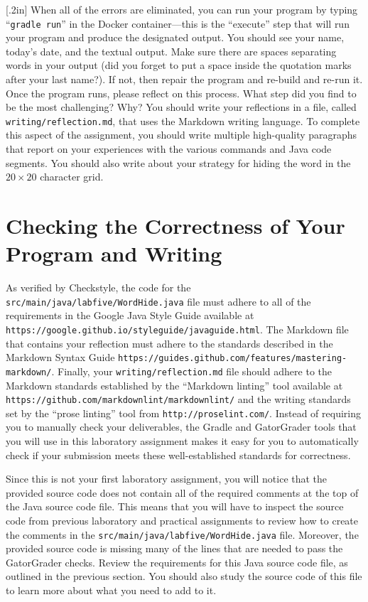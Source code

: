 \documentclass[11pt]{article}
\newcommand{\mainprogramsource}{\lstinline{src/main/java/labfive/WordHide.java}}
\newcommand{\reflection}{\lstinline{writing/reflection.md}}
\newcommand{\gradlerun}{\command{gradle run}}
\newcommand{\command}[1]{``\lstinline{#1}''}
\newcommand{\url}[1]{\lstinline{#1}}
\newcommand{\step}[1]{``{#1}''}
\newcommand{\think}[1]{\null\hfill\LARGE{\faCogs{}}\newline\scriptsize{\em{#1}}}
\begin{document}
\marginnote{\think{Reflect on challenges}}[.2in] When all of the errors are
eliminated, you can run your program by typing \gradlerun{} in the Docker
container---this is the ``execute'' step that will run your program and produce
the designated output. You should see your name, today's date, and the textual
output. Make sure there are spaces separating words in your output (did you
forget to put a space inside the quotation marks after your last name?). If not,
then repair the program and re-build and re-run it. Once the program runs,
please reflect on this process. What step did you find to be the most
challenging? Why? You should write your reflections in a file, called
\reflection{}, that uses the Markdown writing language. To complete this aspect
of the assignment, you should write multiple high-quality paragraphs that report
on your experiences with the various commands and Java code segments. You should
also write about your strategy for hiding the word in the $20 \times 20$
character grid.

\section*{Checking the Correctness of Your Program and Writing}

As verified by Checkstyle, the code for the \mainprogramsource{} file must
adhere to all of the requirements in the Google Java Style Guide available at
\url{https://google.github.io/styleguide/javaguide.html}. The Markdown file that
contains your reflection must adhere to the standards described in the Markdown
Syntax Guide \url{https://guides.github.com/features/mastering-markdown/}.
Finally, your \reflection{} file should adhere to the Markdown standards
established by the \step{Markdown linting} tool available at
\url{https://github.com/markdownlint/markdownlint/} and the writing standards
set by the \step{prose linting} tool from \url{http://proselint.com/}. Instead
of requiring you to manually check your deliverables, the Gradle and GatorGrader
tools that you will use in this laboratory assignment makes it easy for you to
automatically check if your submission meets these well-established standards
for correctness.

Since this is not your first laboratory assignment, you will notice that the
provided source code does not contain all of the required comments at the top of
the Java source code file. This means that you will have to inspect the source
code from previous laboratory and practical assignments to review how to create
the comments in the \mainprogramsource{} file. Moreover, the provided source
code is missing many of the lines that are needed to pass the GatorGrader
checks. Review the requirements for this Java source code file, as outlined in
the previous section. You should also study the source code of this file to
learn more about what you need to add to it.
\end{document}
